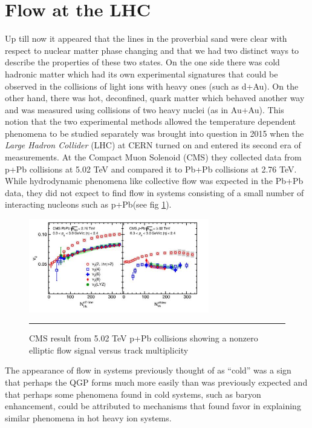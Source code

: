 \section{Flow at the LHC}
Up till now it appeared that the lines in the proverbial sand were clear with respect to nuclear matter phase changing and that we had two distinct ways to describe the properties of these two states. On the one side there was cold hadronic matter which had its own experimental signatures that could be observed in the collisions of light ions with heavy ones (such as d+Au). On the other hand, there was hot, deconfined, quark matter which behaved another way and was measured using collisions of two heavy nuclei (as in Au+Au). This notion that the two experimental methods allowed the temperature dependent phenomena to be studied separately was brought into question in 2015 when the \textit{Large Hadron Collider} (LHC) at CERN turned on and entered its second era of measurements. At the Compact Muon Solenoid (CMS) they collected data from p+Pb collisions at 5.02 TeV and compared it to Pb+Pb collisions at 2.76 TeV. While hydrodynamic phenomena like collective flow was expected in the Pb+Pb data, they did not expect to find flow in systems consisting of a small number of interacting nucleons such as p+Pb(see fig \ref{fig:pPbflow}).

\begin{figure}[htbp!]
  \centering
    \includegraphics[width=0.7\textwidth]{prevplots/pPbflowLHC.JPG}
    \rule{35em}{0.5pt}
  \caption[Elliptic Flow in p+Pb at the LHC]{CMS result from 5.02 TeV p+Pb collisions showing a nonzero elliptic flow signal versus track multiplicity}
  \label{fig:pPbflow}
\end{figure} 

The appearance of flow in systems previously thought of as ``cold'' was a sign that perhaps the QGP forms much more easily than was previously expected and that perhaps some phenomena found in cold systems, such as baryon enhancement, could be attributed to mechanisms that found favor in explaining similar phenomena in hot heavy ion systems.

